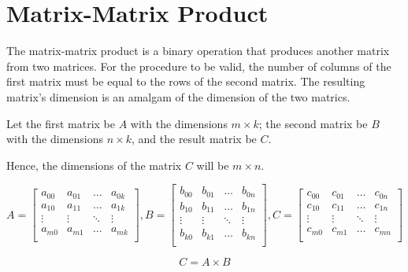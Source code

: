 \chapter{Matrix-Matrix Product}

The matrix-matrix product is a binary operation that produces 
another matrix from two matrices. For the procedure to be valid, 
the number of columns of the first matrix must be equal to the 
rows of the second matrix. The resulting matrix's dimension is 
an amalgam of the dimension of the two matrics.

Let the first matrix be $A$ with the dimensions $m \times k$; 
the second matrix be $B$ with the dimensions $n \times k$, 
and the result matrix be $C$.

Hence, the dimensions of the matrix $C$ will be $m \times n$.

\[
A= 
\begin{bmatrix}
    a_{00}  & a_{01}    & \dots     & a_{0k}\\
    a_{10}  & a_{11}    & \dots     & a_{1k}\\
    \vdots  & \vdots    & \ddots    & \vdots\\
    a_{m0}  & a_{m1}    & \dots     & a_{mk}\\
\end{bmatrix}
,
B= 
\begin{bmatrix}
    b_{00}  & b_{01}    & \dots     & b_{0n}\\
    b_{10}  & b_{11}    & \dots     & b_{1n}\\
    \vdots  & \vdots    & \ddots    & \vdots\\
    b_{k0}  & b_{k1}    & \dots     & b_{kn}\\
\end{bmatrix}
,
C= 
\begin{bmatrix}
    c_{00}  & c_{01}    & \dots     & c_{0n}\\
    c_{10}  & c_{11}    & \dots     & c_{1n}\\
    \vdots  & \vdots    & \ddots    & \vdots\\
    c_{m0}  & c_{m1}    & \dots     & c_{mn}\\
\end{bmatrix}
\]

\vspace*{0.5cm}

\begin{equation}
    C = A \times B
\end{equation}

